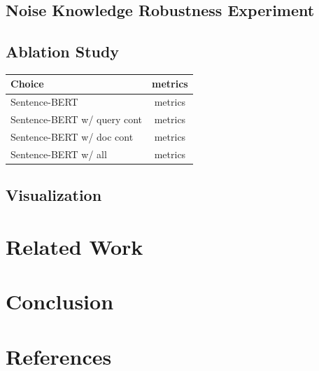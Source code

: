\documentclass{article}
\begin{document}
\subsection{Noise Knowledge Robustness Experiment}

\subsection{Ablation Study}
\begin{center}
\begin{tabular}{lc}
    \toprule
    Choice & metrics \\    
    \midrule   
    Sentence-BERT & metrics \\
    Sentence-BERT w/ query cont & metrics \\
    Sentence-BERT w/ doc cont  & metrics \\
     Sentence-BERT w/ all  & metrics \\
    \bottomrule
\end{tabular}  
\end{center}

\subsection{Visualization}

\section{Related Work}
\section{Conclusion}
\section{References}
\
\end{document}
